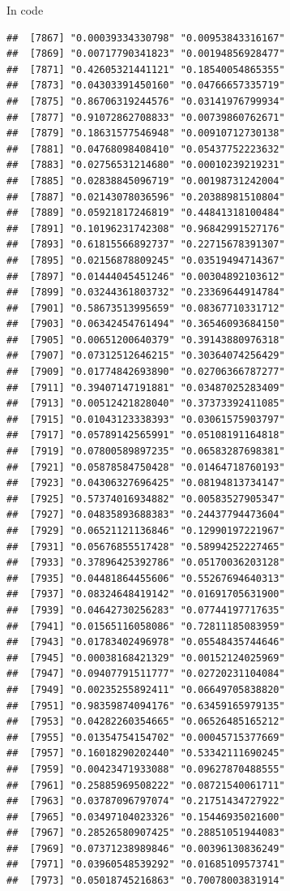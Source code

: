 \documentclass[ignorenonframetext,]{beamer}
\begin{document}
\begin{frame}[fragile]{In code}
\begin{verbatim}
##  [7867] "0.00039334330798" "0.00953843316167"
##  [7869] "0.00717790341823" "0.00194856928477"
##  [7871] "0.42605321441121" "0.18540054865355"
##  [7873] "0.04303391450160" "0.04766657335719"
##  [7875] "0.86706319244576" "0.03141976799934"
##  [7877] "0.91072862708833" "0.00739860762671"
##  [7879] "0.18631577546948" "0.00910712730138"
##  [7881] "0.04768098408410" "0.05437752223632"
##  [7883] "0.02756531214680" "0.00010239219231"
##  [7885] "0.02838845096719" "0.00198731242004"
##  [7887] "0.02143078036596" "0.20388981510804"
##  [7889] "0.05921817246819" "0.44841318100484"
##  [7891] "0.10196231742308" "0.96842991527176"
##  [7893] "0.61815566892737" "0.22715678391307"
##  [7895] "0.02156878809245" "0.03519494714367"
##  [7897] "0.01444045451246" "0.00304892103612"
##  [7899] "0.03244361803732" "0.23369644914784"
##  [7901] "0.58673513995659" "0.08367710331712"
##  [7903] "0.06342454761494" "0.36546093684150"
##  [7905] "0.00651200640379" "0.39143880976318"
##  [7907] "0.07312512646215" "0.30364074256429"
##  [7909] "0.01774842693890" "0.02706366787277"
##  [7911] "0.39407147191881" "0.03487025283409"
##  [7913] "0.00512421828040" "0.37373392411085"
##  [7915] "0.01043123338393" "0.03061575903797"
##  [7917] "0.05789142565991" "0.05108191164818"
##  [7919] "0.07800589897235" "0.06583287698381"
##  [7921] "0.05878584750428" "0.01464718760193"
##  [7923] "0.04306327696425" "0.08194813734147"
##  [7925] "0.57374016934882" "0.00583527905347"
##  [7927] "0.04835893688383" "0.24437794473604"
##  [7929] "0.06521121136846" "0.12990197221967"
##  [7931] "0.05676855517428" "0.58994252227465"
##  [7933] "0.37896425392786" "0.05170036203128"
##  [7935] "0.04481864455606" "0.55267694640313"
##  [7937] "0.08324648419142" "0.01691705631900"
##  [7939] "0.04642730256283" "0.07744197717635"
##  [7941] "0.01565116058086" "0.72811185083959"
##  [7943] "0.01783402496978" "0.05548435744646"
##  [7945] "0.00038168421329" "0.00152124025969"
##  [7947] "0.09407791511777" "0.02720231104084"
##  [7949] "0.00235255892411" "0.06649705838820"
##  [7951] "0.98359874094176" "0.63459165979135"
##  [7953] "0.04282260354665" "0.06526485165212"
##  [7955] "0.01354754154702" "0.00045715377669"
##  [7957] "0.16018290202440" "0.53342111690245"
##  [7959] "0.00423471933088" "0.09627870488555"
##  [7961] "0.25885969508222" "0.08721540061711"
##  [7963] "0.03787096797074" "0.21751434727922"
##  [7965] "0.03497104023326" "0.15446935021600"
##  [7967] "0.28526580907425" "0.28851051944083"
##  [7969] "0.07371238989846" "0.00396130836249"
##  [7971] "0.03960548539292" "0.01685109573741"
##  [7973] "0.05018745216863" "0.70078003831914"

\end{verbatim}
\end{frame}
\end{document}
